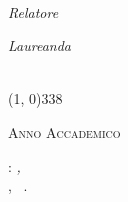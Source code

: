 \begin{titlepage}
\begin{center}
    \begin{large}
    \textsl{\myDegree}\\
    \end{large}
    
    \vspace{20pt} 
    
    \begin{large}
    \begin{flushleft}
    \textit{Relatore}\\ 
    \vspace{5pt} 
    \profTitle \myProf
    \end{flushleft}
    
    \vspace{0pt} 
    
    \begin{flushright}
    \textit{Laureanda}\\
    \vspace{5pt} 
    \myName\\
    \myCode
    \end{flushright}
    \end{large}
    
    \vspace{40pt}
    
    \line(1, 0){338} \\
    \begin{normalsize}
    \textsc{Anno Accademico \myAA}
    \end{normalsize}
    
    \end{center}
    \end{titlepage}

\clearpage
{}
\thispagestyle{empty}
\hfill
\vfill
\noindent\myName: \textit{\myTitle,}\\
\myDegree,
\textcopyright\ \myTime.
\newpage
